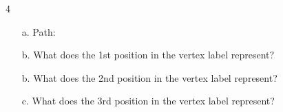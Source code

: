 \documentclass[a4paper,12pt]{book}
\newcounter{question}
\begin{document}
\begin{question}{\thequestion}{4}
    \begin{itemize}
        \item[a.]   Path:

        \item[b.]   What does the 1st position in the vertex label represent?

        \item[b.]   What does the 2nd position in the vertex label represent?

        \item[c.]   What does the 3rd position in the vertex label represent?
    \end{itemize}

\end{question}
\end{document}

